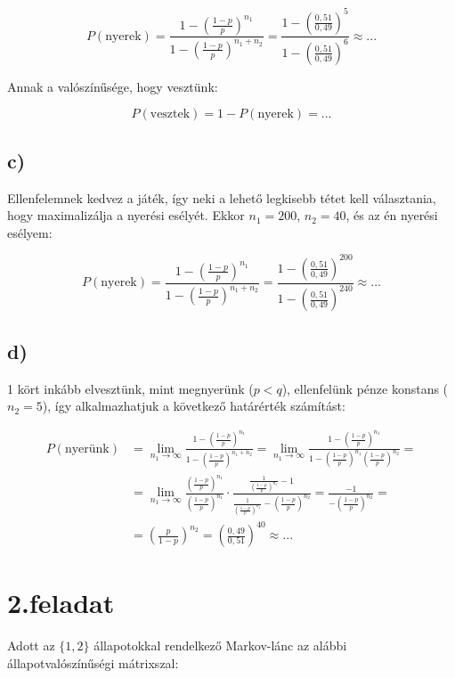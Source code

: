 \documentclass[a4paper,12pt]{article}
\begin{document}
\[
P(\textrm{nyerek}) = 
\frac{1 - \left( \frac{1-p}{p} \right)^{n_1}}
{1 - \left( \frac{1-p}{p} \right)^{n_1 + n_2}} = 
\frac{1 - \left( \frac{0,51}{0,49} \right)^{5}}
{1 - \left( \frac{0,51}{0,49} \right)^{6}} \approx ...
\]

Annak a valószínűsége, hogy vesztünk:

\[
P(\textrm{vesztek}) = 1 - P(\textrm{nyerek}) = ...
\]

\subsection*{c)}
Ellenfelemnek kedvez a játék, így neki a lehető legkisebb tétet kell
választania, hogy maximalizálja a nyerési esélyét. 
Ekkor $n_1 = 200$, $n_2 = 40$, és az én nyerési esélyem:

\[
P(\textrm{nyerek}) = 
\frac{1 - \left( \frac{1-p}{p} \right)^{n_1}}
{1 - \left( \frac{1-p}{p} \right)^{n_1 + n_2}} = 
\frac{1 - \left( \frac{0,51}{0,49} \right)^{200}}
{1 - \left( \frac{0,51}{0,49} \right)^{240}} \approx ...
\]

\subsection*{d)}
1 kört inkább elvesztünk, mint megnyerünk ($p < q$), ellenfelünk pénze
konstans ($n_2 = 5$), így alkalmazhatjuk a következő határérték számítást:

\[
\begin{split}
P(\text{nyerünk}) &= 
\lim_{n_1 \to \infty} \frac{1-\left(\frac{1-p}{p}\right)^{n_1}}
{1-\left(\frac{1-p}{p}\right)^{n_1+n_2}} =
\lim_{n_1 \to \infty} \frac{1-\left(\frac{1-p}{p}\right)^{n_1}}
{1-\left(\frac{1-p}{p}\right)^{n_1}\left(\frac{1-p}{p}\right)^{n_2}} =\\
&= \lim_{n_1 \to \infty} \frac{\left(\frac{1-p}{p}\right)^{n_1}}
{\left(\frac{1-p}{p}\right)^{n_1}} \cdot 
\frac{\frac{1}{\left(\frac{1-p}{p}\right)^{n_1}}-1}
{\frac{1}{\left(\frac{1-p}{p}\right)^{n_1}} -
\left(\frac{1-p}{p}\right)^{n_2}} 
= \frac{-1}{-\left(\frac{1-p}{p}\right)^{n_2}} =\\
&= \left(\frac{p}{1-p}\right)^{n_2} = 
\left(\frac{0,49}{0,51}\right)^{40} \approx ...
\end{split}
\]

\section*{2.feladat}
Adott az $\{1, 2\}$ állapotokkal rendelkező Markov-lánc 
az alábbi állapotvalószínűségi mátrixszal:
\end{document}
